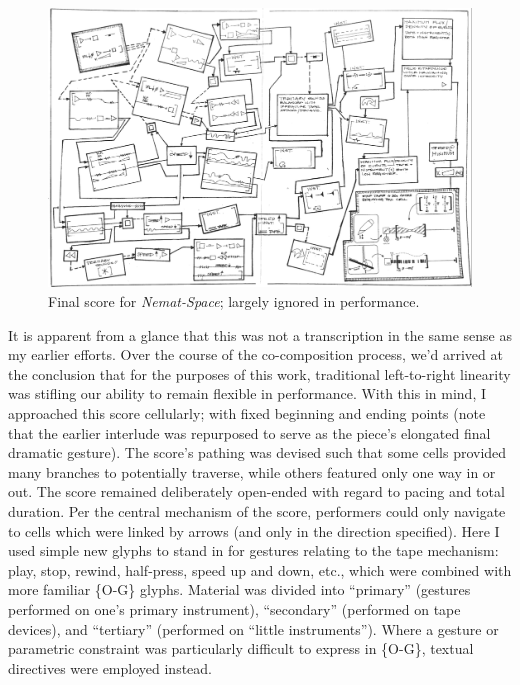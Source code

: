         \begin{figure}
            \centering
            \includegraphics[width=.9\textwidth]{images/chapter4/nemat-space-small-min.png}
            \captionsetup{width=.5\textwidth}
            \caption{Final score for \textit{Nemat-Space}; largely ignored in performance.}
            \label{fig:nematfinal}
        \end{figure}        

    \noindent It is apparent from a glance that this was not a transcription in the same sense as my earlier efforts. Over the course of the co-composition process, we'd arrived at the conclusion that for the purposes of this work, traditional left-to-right linearity was stifling our ability to remain flexible in performance. With this in mind, I approached this score cellularly; with fixed beginning and ending points (note that the earlier interlude was repurposed to serve as the piece's elongated final dramatic gesture). The score's pathing was devised such that some cells provided many branches to potentially traverse, while others featured only one way in or out. The score remained deliberately open-ended with regard to pacing and total duration. Per the central mechanism of the score, performers could only navigate to cells which were linked by arrows (and only in the direction specified). Here I used simple new glyphs to stand in for gestures relating to the tape mechanism: play, stop, rewind, half-press, speed up and down, etc., which were combined with more familiar \{O-G\} glyphs. Material was divided into ``primary'' (gestures performed on one's primary instrument), ``secondary'' (performed on tape devices), and ``tertiary'' (performed on ``little instruments''). Where a gesture or parametric constraint was particularly difficult to express in \{O-G\}, textual directives were employed instead. 
        
